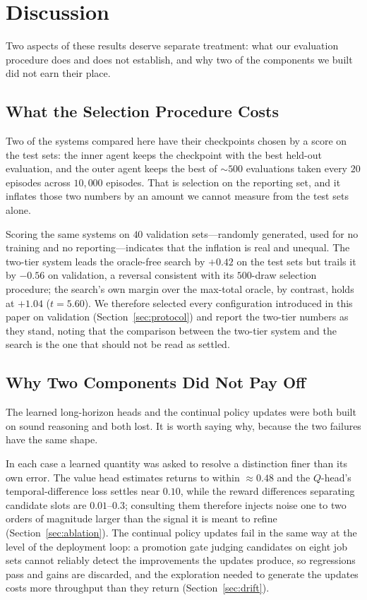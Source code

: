 \documentclass{article}
\begin{document}
\section{Discussion}

Two aspects of these results deserve separate treatment: what our evaluation
procedure does and does not establish, and why two of the components we built did
not earn their place.

\subsection{What the Selection Procedure Costs}
\label{sec:selection}

Two of the systems compared here have their checkpoints chosen by a score on the
test sets: the inner agent keeps the checkpoint with the best held-out evaluation,
and the outer agent keeps the best of ${\sim}500$ evaluations taken every $20$
episodes across $10{,}000$ episodes. That is selection
on the reporting set, and it inflates those two numbers by an amount we cannot
measure from the test sets alone.

Scoring the same systems on $40$ validation sets---randomly generated, used for no
training and no reporting---indicates that the inflation is real and unequal. The
two-tier system leads the oracle-free search by $+0.42$ on the test sets but
trails it by $-0.56$ on validation, a reversal consistent with its $500$-draw
selection procedure; the search's own margin over the max-total oracle, by
contrast, holds at $+1.04$ ($t = 5.60$). We therefore selected every configuration
introduced in this paper on validation (Section~\ref{sec:protocol}) and report the
two-tier numbers as they stand, noting that the comparison between the two-tier
system and the search is the one that should not be read as settled.

\subsection{Why Two Components Did Not Pay Off}

The learned long-horizon heads and the continual policy updates were both built on
sound reasoning and both lost. It is worth saying why, because the two failures
have the same shape.

In each case a learned quantity was asked to resolve a distinction finer than its
own error. The value head estimates returns to within ${\approx}0.48$ and the
$Q$-head's temporal-difference loss settles near $0.10$, while the reward
differences separating candidate slots are $0.01$--$0.3$; consulting them
therefore injects noise one to two orders of magnitude larger than the signal it
is meant to refine (Section~\ref{sec:ablation}). The continual policy updates fail
in the same way at the level of the deployment loop: a promotion gate judging
candidates on eight job sets cannot reliably detect the improvements the updates
produce, so regressions pass and gains are discarded, and the exploration needed
to generate the updates costs more throughput than they return
(Section~\ref{sec:drift}).
\end{document}
